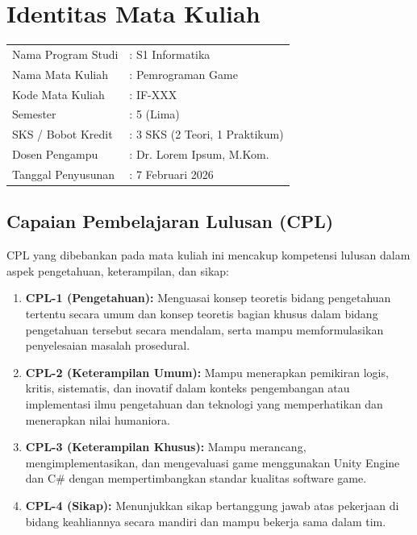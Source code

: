 \cleardoublepage

\chapter*{Identitas Mata Kuliah}

\begin{tabular}{ll}
  Nama Program Studi & : S1 Informatika \\
  Nama Mata Kuliah & : Pemrograman Game \\
  Kode Mata Kuliah & : IF-XXX \\
  Semester & : 5 (Lima) \\
  SKS / Bobot Kredit & : 3 SKS (2 Teori, 1 Praktikum) \\
  Dosen Pengampu & : Dr. Lorem Ipsum, M.Kom. \\
  Tanggal Penyusunan & : 7 Februari 2026 \\
\end{tabular}

\vspace{1cm}

\section*{Capaian Pembelajaran Lulusan (CPL)}

CPL yang dibebankan pada mata kuliah ini mencakup kompetensi lulusan dalam aspek pengetahuan, keterampilan, dan sikap:

\begin{enumerate}
  \item \textbf{CPL-1 (Pengetahuan):} Menguasai konsep teoretis bidang pengetahuan tertentu secara umum dan konsep teoretis bagian khusus dalam bidang pengetahuan tersebut secara mendalam, serta mampu memformulasikan penyelesaian masalah prosedural.
  
  \item \textbf{CPL-2 (Keterampilan Umum):} Mampu menerapkan pemikiran logis, kritis, sistematis, dan inovatif dalam konteks pengembangan atau implementasi ilmu pengetahuan dan teknologi yang memperhatikan dan menerapkan nilai humaniora.
  
  \item \textbf{CPL-3 (Keterampilan Khusus):} Mampu merancang, mengimplementasikan, dan mengevaluasi game menggunakan Unity Engine dan C\# dengan mempertimbangkan standar kualitas software game.
  
  \item \textbf{CPL-4 (Sikap):} Menunjukkan sikap bertanggung jawab atas pekerjaan di bidang keahliannya secara mandiri dan mampu bekerja sama dalam tim.
\end{enumerate}

